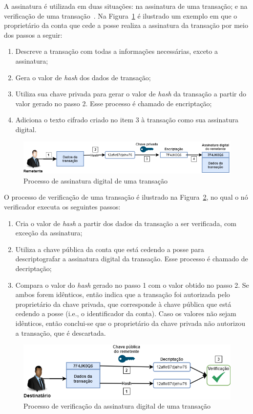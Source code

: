 A assinatura é utilizada em duas situações: na assinatura de uma transação; e na verificação de uma transação~\cite{overview-ahmed-2019}. Na Figura~\ref{fig:retemente-assinatura-digital} é ilustrado um exemplo em que o proprietário da conta que cede a posse realiza a assinatura da transação por meio dos passos a seguir:
\begin{enumerate}
    \item Descreve a transação com todas a informações necessárias, exceto a assinatura;
    \item Gera o valor de \textit{hash} dos dados de transação;
    \item Utiliza sua chave privada para gerar o valor de \textit{hash} da transação a partir do valor gerado no passo 2. Esse processo é chamado de encriptação;
    \item Adiciona o texto cifrado criado no item 3 à transação como sua assinatura digital.
\end{enumerate}

\begin{figure}[htb]
 \caption{Processo de assinatura digital de uma transação}
 \label{fig:retemente-assinatura-digital}
 \centering
 \includegraphics[scale=0.5]{figuras/remetente_assinatura_digital.png}
\end{figure}

O processo de verificação de uma transação é ilustrado na Figura~\ref{fig:verifica-assinatura-digital}, no qual o nó verificador executa os seguintes passos:
\begin{enumerate}
    \item Cria o valor de \textit{hash} a partir dos dados da transação a ser verificada, com exceção da assinatura;
    \item Utiliza a chave pública da conta que está cedendo a posse para descriptografar a assinatura digital da transação. Esse processo é chamado de decriptação;
    \item Compara o valor do \textit{hash} gerado no passo 1 com o valor obtido no passo 2. Se ambos forem idênticos, então indica que a transação foi autorizada pelo proprietário da chave privada, que corresponde à chave pública que está cedendo a posse (i.e., o identificador da conta). Caso os valores não sejam idênticos, então conclui-se que o proprietário da chave privada não autorizou a transação, que é descartada. 
\end{enumerate}

\begin{figure}[htb]
 \caption{Processo de verificação da assinatura digital de uma transação}
 \label{fig:verifica-assinatura-digital}
 \centering
 \includegraphics[scale=0.5]{figuras/verifica_assinatura_digital.png}
\end{figure}